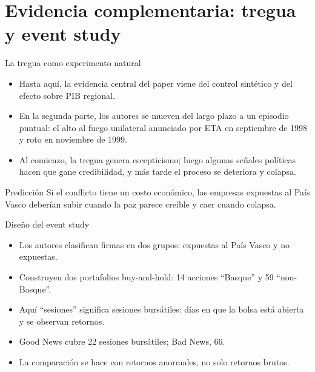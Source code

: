 \documentclass[aspectratio=1610]{beamer}
\begin{document}
\section{Evidencia complementaria: tregua y event study}

\begin{frame}{La tregua como experimento natural}
    \begin{itemize}
        \item Hasta aquí, la evidencia central del paper viene del control sintético y del efecto sobre PIB regional.
        \item En la segunda parte, los autores se mueven del largo plazo a un episodio puntual: el alto al fuego unilateral anunciado por ETA en septiembre de 1998 y roto en noviembre de 1999.
        \item Al comienzo, la tregua genera escepticismo; luego algunas señales políticas hacen que gane credibilidad, y más tarde el proceso se deteriora y colapsa.
    \end{itemize}
    \begin{block}{Predicción}
        Si el conflicto tiene un costo económico, las empresas expuestas al País Vasco deberían subir cuando la paz parece creíble y caer cuando colapsa.
    \end{block}
\end{frame}

\begin{frame}{Diseño del event study}
    \begin{itemize}
        \item Los autores clasifican firmas en dos grupos: expuestas al País Vasco y no expuestas.
        \item Construyen dos portafolios buy-and-hold: 14 acciones ``Basque'' y 59 ``non-Basque''.
        \item Aquí ``sesiones'' significa sesiones bursátiles: días en que la bolsa está abierta y se observan retornos.
        \item Good News cubre 22 sesiones bursátiles; Bad News, 66.
        \item La comparación se hace con retornos anormales, no solo retornos brutos.
    \end{itemize}
\end{frame}
\end{document}
